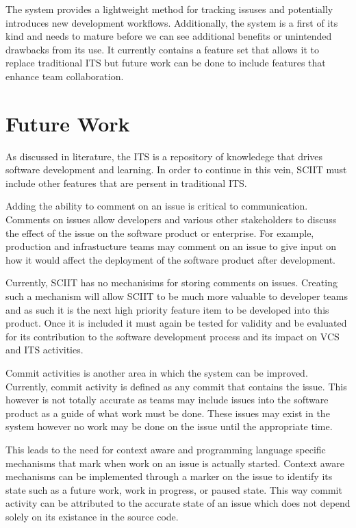 \documentclass{mproj}
\begin{document}
The system provides a lightweight method for tracking issuses and potentially introduces new development workflows. Additionally, the system is a first of its kind and needs to mature before we can see additional benefits or unintended drawbacks from its use. It currently contains a feature set that allows it to replace traditional ITS but future work can be done to include features that enhance team collaboration.

\section{Future Work}

As discussed in literature, the ITS is a repository of knowledege that drives software development and learning. In order to continue in this vein, SCIIT must include other features that are persent in traditional ITS.

Adding the ability to comment on an issue is critical to communication. Comments on issues allow developers and various other stakeholders to discuss the effect of the issue on the software product or enterprise. For example, production and infrastucture teams may comment on an issue to give input on how it would affect the deployment of the software product after development.

Currently, SCIIT has no mechanisims for storing comments on issues. Creating such a mechanism will allow SCIIT to be much more valuable to developer teams and as such it is the next high priority feature item to be developed into this product. Once it is included it must again be tested for validity and be evaluated for its contribution to the software development process and its impact on VCS and ITS activities.

Commit activities is another area in which the system can be improved. Currently, commit activity is defined as any commit that contains the issue. This however is not totally accurate as teams may include issues into the software product as a guide of what work must be done. These issues may exist in the system however no work may be done on the issue until the appropriate time.

This leads to the need for context aware and programming language specific mechanisms that mark when work on an issue is actually started. Context aware mechanisms can be implemented through a marker on the issue to identify its state such as a future work, work in progress, or paused state. This way commit activity can be attributed to the accurate state of an issue which does not depend solely on its existance in the source code.
\end{document}
